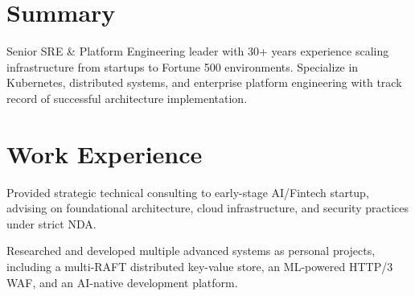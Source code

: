 \documentclass[11pt,a4paper,sans]{moderncv}
\begin{document}
\makecvtitle


\section{Summary}
Senior SRE & Platform Engineering leader with 30+ years experience scaling infrastructure from startups to Fortune 500 environments. Specialize in Kubernetes, distributed systems, and enterprise platform engineering with track record of successful architecture implementation.



\section{Work Experience}


  
  \item{ Provided strategic technical consulting to early-stage AI/Fintech startup, advising on foundational architecture, cloud infrastructure, and security practices under strict NDA. }
  
  \item{ Researched and developed multiple advanced systems as personal projects, including a multi-RAFT distributed key-value store, an ML-powered HTTP/3 WAF, and an AI-native development platform. }
  
\end{document}
